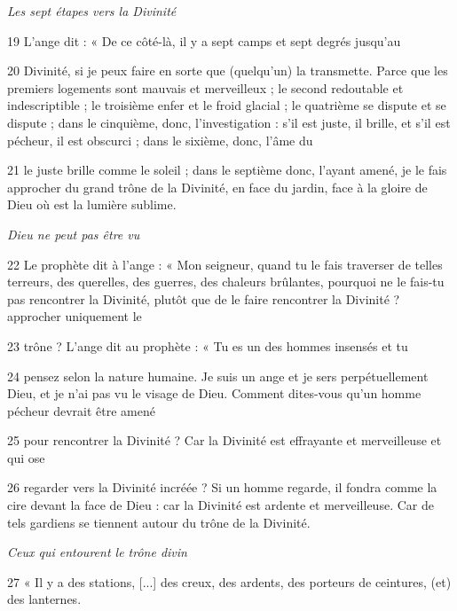 \par \textit{Les sept étapes vers la Divinité}

\par 19 L'ange dit : « De ce côté-là, il y a sept camps et sept degrés jusqu'au

\par 20 Divinité, si je peux faire en sorte que (quelqu'un) la transmette. Parce que les premiers logements sont mauvais et merveilleux ; le second redoutable et indescriptible ; le troisième enfer et le froid glacial ; le quatrième se dispute et se dispute ; dans le cinquième, donc, l'investigation : s'il est juste, il brille, et s'il est pécheur, il est obscurci ; dans le sixième, donc, l'âme du

\par 21 le juste brille comme le soleil ; dans le septième donc, l'ayant amené, je le fais approcher du grand trône de la Divinité, en face du jardin, face à la gloire de Dieu où est la lumière sublime.

\par \textit{Dieu ne peut pas être vu}

\par 22 Le prophète dit à l'ange : « Mon seigneur, quand tu le fais traverser de telles terreurs, des querelles, des guerres, des chaleurs brûlantes, pourquoi ne le fais-tu pas rencontrer la Divinité, plutôt que de le faire rencontrer la Divinité ? approcher uniquement le

\par 23 trône ? L'ange dit au prophète : « Tu es un des hommes insensés et tu

\par 24 pensez selon la nature humaine. Je suis un ange et je sers perpétuellement Dieu, et je n'ai pas vu le visage de Dieu. Comment dites-vous qu'un homme pécheur devrait être amené

\par 25 pour rencontrer la Divinité ? Car la Divinité est effrayante et merveilleuse et qui ose

\par 26 regarder vers la Divinité incréée ? Si un homme regarde, il fondra comme la cire devant la face de Dieu : car la Divinité est ardente et merveilleuse. Car de tels gardiens se tiennent autour du trône de la Divinité.

\par \textit{Ceux qui entourent le trône divin}

\par 27 « Il y a des stations, [...] des creux, des ardents, des porteurs de ceintures, (et) des lanternes.

